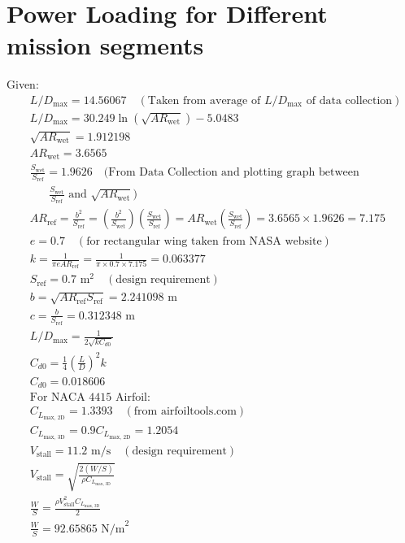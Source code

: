 \documentclass[12 pt]{article}
\begin{document}
\newpage

\section{Power Loading for Different mission segments}
Given:
\begin{align*}
& L/D_{\text{max}} = 14.56067 \quad (\text{Taken from average of } L/D_{\text{max}} \text{ of data collection}) \\
& L/D_{\text{max}} = 30.249 \ln(\sqrt{AR_{\text{wet}}}) - 5.0483 \\
& \sqrt{AR_{\text{wet}}} = 1.912198 \\
& AR_{\text{wet}} = 3.6565 \\
& \frac{S_{\text{wet}}}{S_{\text{ref}}} = 1.9626 \quad (\text{From Data Collection and plotting graph between} \\
& \quad \text{ } \frac{S_{\text{wet}}}{S_{\text{ref}}} \text{ and } \sqrt{AR_{\text{wet}}}) \\
& AR_{\text{ref}} = \frac{b^2}{S_{\text{ref}}} = \left(\frac{b^2}{S_{\text{wet}}}\right) \left(\frac{S_{\text{wet}}}{S_{\text{ref}}}\right) = AR_{\text{wet}} \left(\frac{S_{\text{wet}}}{S_{\text{ref}}}\right) = 3.6565 \times 1.9626 = 7.175 \\
& e = 0.7 \quad (\text{for rectangular wing taken from NASA website}) \\
& k = \frac{1}{\pi e AR_{\text{ref}}} = \frac{1}{\pi \times 0.7 \times 7.175} = 0.063377 \\
& S_{\text{ref}} = 0.7 \text{ m}^2 \quad (\text{design requirement}) \\
& b = \sqrt{AR_{\text{ref}} S_{\text{ref}}} = 2.241098 \text{ m} \\
& c = \frac{b}{S_{\text{ref}}} = 0.312348 \text{ m} \\
& L/D_{\text{max}} = \frac{1}{2\sqrt{k C_{d0}}} \\
& C_{d0} = \frac{1}{4} \left(\frac{L}{D}\right)^2 k \\
& C_{d0} = 0.018606 \\
& \text{For NACA 4415 Airfoil:} \\
& C_{L_{\text{max, 2D}}} = 1.3393 \quad (\text{from airfoiltools.com}) \\
& C_{L_{\text{max, 3D}}} = 0.9 C_{L_{\text{max, 2D}}} = 1.2054 \\
& V_{\text{stall}} = 11.2 \text{ m/s} \quad (\text{design requirement}) \\
& V_{\text{stall}} = \sqrt{\frac{2(W/S)}{\rho C_{L_{\text{max, 3D}}}}} \\
& \frac{W}{S} = \frac{\rho V_{\text{stall}}^2 C_{L_{\text{max, 3D}}}}{2} \\
& \frac{W}{S} = 92.65865 \text{ N/m}^2 \\
\end{align*}
\end{document}
